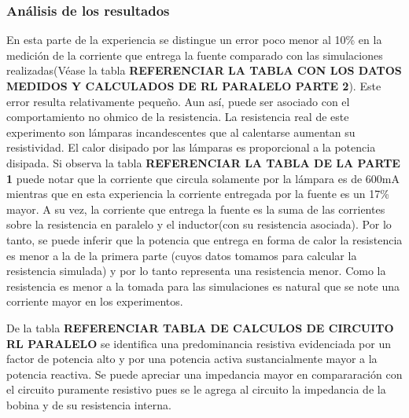 \subsubsection{Análisis de los resultados}
En esta parte de la experiencia se distingue un error poco menor al 10\% en la medición de la corriente que entrega la fuente comparado con las simulaciones realizadas(Véase la tabla \textbf{REFERENCIAR LA TABLA CON LOS DATOS MEDIDOS Y CALCULADOS DE RL PARALELO PARTE 2}). Este error resulta relativamente pequeño. Aun así, puede ser asociado con el comportamiento no ohmico de la resistencia. La resistencia real de este experimento son lámparas incandescentes que al calentarse aumentan su resistividad. El calor disipado por las lámparas es proporcional a la potencia disipada. Si observa la tabla \textbf{REFERENCIAR LA TABLA DE LA PARTE 1} puede notar que la corriente que circula solamente por la lámpara es de 600mA mientras que en esta experiencia la corriente entregada por la fuente es un 17\% mayor. A su vez, la corriente que entrega la fuente es la suma de las corrientes sobre la resistencia en paralelo y el inductor(con su resistencia asociada). Por lo tanto, se puede inferir que la potencia que entrega en forma de calor la resistencia es menor a la de la primera parte (cuyos datos tomamos para calcular la resistencia simulada) y por lo tanto representa una resistencia menor. Como la resistencia es menor a la tomada para las simulaciones es natural que se note una corriente mayor en los experimentos.

De la tabla \textbf{REFERENCIAR TABLA DE CALCULOS DE CIRCUITO RL PARALELO} se identifica una predominancia resistiva evidenciada por un factor de potencia alto y por una potencia activa sustancialmente mayor a la potencia reactiva. Se puede apreciar una impedancia mayor en compararación con el circuito puramente resistivo pues se le agrega al circuito la impedancia de la bobina y de su resistencia interna. 


